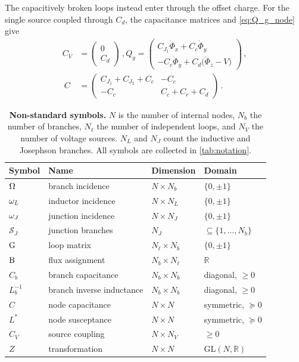 The capacitively broken loops instead enter through the offset charge.
For the single source coupled through $C_d$, the capacitance matrices and \cref{eq:Q_g_node} give
\begin{align}\label{eq:driveAndC}
    C_V&=\begin{pmatrix}0\\C_d\end{pmatrix}\,, Q_g=\begin{pmatrix}C_{J_1}\dot\Phi_x+C_c\dot\Phi_y\\-C_c\dot\Phi_y+C_d\bigl(\dot\Phi_z-V\bigr)\end{pmatrix}\,,\\\
    C&=\begin{pmatrix}C_{J_1}+C_{J_2}+C_c&-C_c\\-C_c&C_c+C_r+C_d\end{pmatrix}\,. \nonumber
\end{align}

\begin{table}[t]
\centering
\footnotesize
\setlength{\tabcolsep}{4pt}
\renewcommand{\arraystretch}{1.15}
\begin{tabular*}{\columnwidth}{@{\extracolsep{\fill}}llll@{}}
\toprule
Symbol & Name & Dimension & Domain \\
\midrule
$\Omega$ & branch incidence & $N \times N_b$ & $\{0,\pm1\}$ \\
$\omega_L$ & inductor incidence & $N \times N_L$ & $\{0,\pm1\}$ \\
$\omega_J$ & junction incidence & $N \times N_J$ & $\{0,\pm1\}$ \\
$\mathcal{S}_J$ & junction branches & $N_J$ & $\subseteq\{1,\dots,N_b\}$ \\
$\mathrm{G}$ & loop matrix & $N_\ell \times N_b$ & $\{0,\pm1\}$ \\
$\mathrm{B}$ & flux assignment & $N_b \times N_\ell$ & $\mathbb{R}$ \\
$C_b$ & branch capacitance & $N_b \times N_b$ & diagonal, $\geq 0$ \\
$L_b^{-1}$ & branch inverse inductance & $N_b \times N_b$ & diagonal, $\geq 0$ \\
$C$ & node capacitance & $N \times N$ & symmetric, $\succeq 0$ \\
$L^*$ & node susceptance & $N \times N$ & symmetric, $\succeq 0$ \\
$C_V$ & source coupling & $N \times N_V$ & $\geq 0$ \\
$Z$ & transformation & $N \times N$ & $\mathrm{GL}(N,\mathbb{R})$ \\
\bottomrule
\end{tabular*}
\caption{{\bf Non-standard symbols.}
$N$ is the number of internal nodes, $N_b$ the number of branches, $N_\ell$ the number of independent loops, and $N_V$ the number of voltage sources.
$N_L$ and $N_J$ count the inductive and Josephson branches.
All symbols are collected in \cref{tab:notation}.}
\label{tab:symbols}
\end{table}

